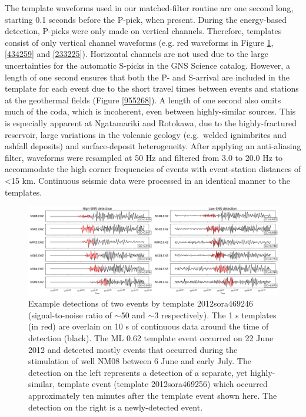 The template waveforms used in our matched-filter routine are one second long, starting 0.1 seconds before the P-pick, when present. During the energy-based detection, P-picks were only made on vertical channels. Therefore, templates consist of only vertical channel waveforms (e.g. red waveforms in Figure \ref{249518}, \ref{434259} and \ref{233225}). Horizontal channels are not used due to the large uncertainties for the automatic S-picks in the GNS Science catalog. However, a length of one second ensures that both the P- and S-arrival are included in the template for each event due to the short travel times between events and stations at the geothermal fields (Figure \ref{955268}). A length of one second also omits much of the coda, which is incoherent, even between highly-similar sources. This is especially apparent at Ngatamariki and Rotokawa, due to the highly-fractured reservoir, large variations in the volcanic geology (e.g.\ welded ignimbrites and ashfall deposits) and surface-deposit heterogeneity. After applying an anti-aliasing filter, waveforms were resampled at 50 Hz and filtered from 3.0 to 20.0 Hz to accommodate the high corner frequencies of events with event-station distances of \textless15 km. Continuous seismic data were processed in an identical manner to the templates.
\begin{figure}[h!]
\begin{center}
\includegraphics[width=0.98\columnwidth]{Chapter_2_Data/figures/det_example_publication/det_example_publication_original}
\caption{{Example detections of two events by template 2012sora469246
(signal-to-noise ratio of $\sim$50 and $\sim$3
respectively). The 1 s templates (in red) are overlain on 10 s of
continuous data around the time of detection (black). The ML 0.62
template event occurred on 22 June 2012 and detected mostly events that
occurred during the stimulation of well NM08 between 6 June and early
July. The detection on the left represents a detection of a separate,
yet highly-similar, template event (template 2012sora469256) which
occurred approximately ten minutes after the template event shown here.
The detection on the right is a newly-detected event.
{\label{249518}}%
}}
\end{center}
\end{figure}

